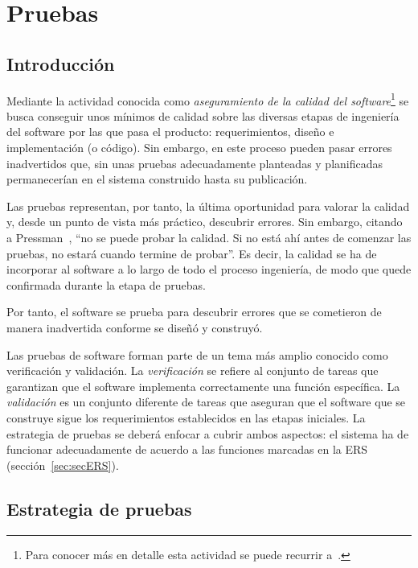 \chapter{Pruebas}


\section{Introducción}

Mediante la actividad conocida como \emph{aseguramiento de la calidad del software}\footnote{Para conocer más en detalle esta actividad se puede recurrir a~\cite{Pre10}.} se busca conseguir unos mínimos de calidad sobre las diversas etapas de ingeniería del software por las que pasa el producto: requerimientos, diseño e implementación (o código). Sin embargo, en este proceso pueden pasar errores inadvertidos que, sin unas pruebas adecuadamente planteadas y planificadas permanecerían en el sistema construido hasta su publicación.

Las pruebas representan, por tanto, la última oportunidad para valorar la calidad y, desde un punto de vista más práctico, descubrir errores. Sin embargo, citando a Pressman~\cite{Pre10}, ``no se puede probar la calidad. Si no está ahí antes de comenzar las pruebas, no estará cuando termine de probar''. Es decir, la calidad se ha de incorporar al software a lo largo de todo el proceso ingeniería, de modo que quede confirmada durante la etapa de pruebas.

Por tanto, el software se prueba para descubrir errores que se cometieron de manera inadvertida conforme se diseñó y construyó.

Las pruebas de software forman parte de un tema más amplio conocido como verificación y validación. La \emph{verificación} se refiere al conjunto de tareas que garantizan que el software implementa correctamente una función específica. La \emph{validación} es un conjunto diferente de tareas que aseguran que el software que se construye sigue los requerimientos establecidos en las etapas iniciales. La estrategia de pruebas se deberá enfocar a cubrir ambos aspectos: el sistema ha de funcionar adecuadamente de acuerdo a las funciones marcadas en la ERS (sección~\ref{sec:secERS}).

\section{Estrategia de pruebas}

